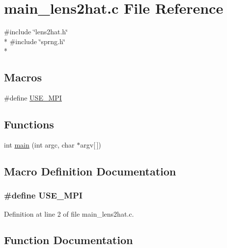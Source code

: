 \section{main\-\_\-lens2hat.\-c File Reference}
\label{main__lens2hat_8c}
{\ttfamily \#include \char`\"{}lens2hat.\-h\char`\"{}}\\*
{\ttfamily \#include \char`\"{}sprng.\-h\char`\"{}}\\*
\subsection*{Macros}
\begin{DoxyCompactItemize}
\item 
\#define \hyperlink{main__lens2hat_8c_a3869d282031f6ea6b50fdb980b758420}{U\-S\-E\-\_\-\-M\-P\-I}
\end{DoxyCompactItemize}
\subsection*{Functions}
\begin{DoxyCompactItemize}
\item 
int \hyperlink{main__lens2hat_8c_a0ddf1224851353fc92bfbff6f499fa97}{main} (int argc, char $\ast$argv\mbox{[}$\,$\mbox{]})
\end{DoxyCompactItemize}


\subsection{Macro Definition Documentation}
\subsubsection[{U\-S\-E\-\_\-\-M\-P\-I}]{\setlength{\rightskip}{0pt plus 5cm}\#define U\-S\-E\-\_\-\-M\-P\-I}\label{main__lens2hat_8c_a3869d282031f6ea6b50fdb980b758420}


Definition at line 2 of file main\-\_\-lens2hat.\-c.



\subsection{Function Documentation}
